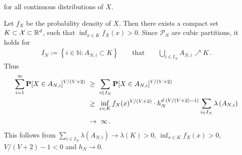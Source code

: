 for all continuous distributions of $X$.
\begin{example}
  Let $f_X$ be the probability density of $X$. 
  Then there exists a compact set $K\subset\mathcal{X}\subset \mathbb{R}^d$, such that
  $
  \inf_{x\in K}f_X(x)
  >0
  $. Since $\mathcal{P}_N$ are cubic partitions, it holds for 
  \begin{gather*}
    I_N
    :=
    \left\{ 
      i\in\mathbb{N}\colon
      A_{N,i}\subset K
    \right\}
    \qquad
    \text{that}
    \qquad
    \bigcup_{i\in I_N}A_{N,i}\nearrow K
    \,.
  \end{gather*}
Thus
\begin{align*}
  \sum_{i=1}^\infty
  \P
  [
  X\in A_{N,i}
  ]^{V/(V+2)}
  &
  \ 
  \ge
  \ 
  \sum_{i\in I_N}
  \P
  [
  X\in A_{N,i}
  ]^{V/(V+2)}
  \\
  &
  \ 
  \ge
  \ 
  \inf_{x\in K}f_X(x)
  ^{V/(V+2)}
  \cdot 
  h_N^{d\cdot(V/(V+2)-1)}
  \sum_{i\in I_N}
  \lambda
  \left( 
  A_{N,i}
  \right)
  \\
  &
  \ 
  \to
  \ 
  \infty
  \,.
\end{align*}
This follows from
$
  \sum_{i\in I_N}
  \lambda
  \left( 
  A_{N,i}
  \right)
  \to 
  \lambda(K)>0
$,
  $
  \inf_{x\in K}f_X(x)
  >0
  $,
  $V/(V+2)-1<0$ and $h_N\to 0$.

\end{example}

